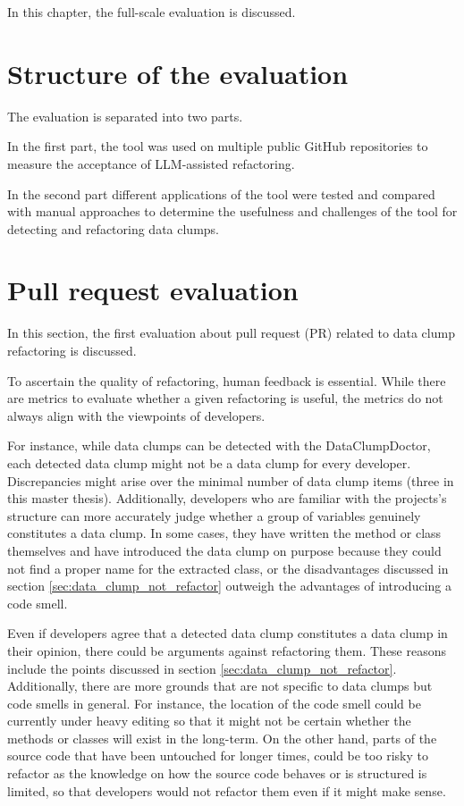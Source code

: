 
In this chapter, the full-scale evaluation is discussed.
\section{Structure of the evaluation}

The evaluation is separated into two parts.

In the first part, the tool was used on multiple public GitHub repositories to measure the acceptance of \ac{LLM}-assisted refactoring.

In the second part different applications of the tool were tested and compared with manual approaches to determine the usefulness and challenges of the tool for detecting and refactoring data clumps.






\section{Pull request evaluation}\label{sec:pull_request_eval}
In this section, the first evaluation about pull request (PR) related to data clump refactoring is discussed. 

To ascertain the quality of refactoring, human feedback is essential. While there are metrics to evaluate whether a given refactoring is useful, the metrics do not always align with the viewpoints of developers. 

 For instance, while data clumps can be detected with the DataClumpDoctor, each detected data clump might not be a data clump for every developer. Discrepancies might arise over the minimal number of data clump items (three in this master thesis). Additionally, developers who are  familiar with the projects's structure can more accurately judge  whether a group of variables  genuinely constitutes a data clump. In some cases, they have written the method or class themselves and have introduced the data clump on purpose because they could not find a proper name for the extracted class, or the disadvantages discussed in section \ref{sec:data_clump_not_refactor} outweigh the advantages of introducing a code smell. 

Even if developers agree that a detected data clump constitutes a data clump  in their opinion, there could be arguments against refactoring them. These reasons include the points  discussed in section \ref{sec:data_clump_not_refactor}. Additionally, there are more grounds that are not specific to data clumps but code smells in general. For instance, the location of the code smell could be currently under heavy editing so that it might not be certain whether the methods or classes will exist in the long-term. On the other hand, parts of the source code that have been untouched for longer times, could be too risky to refactor as the knowledge on how the source code behaves or is structured is limited, so that developers would not refactor them even if it might make sense. 

